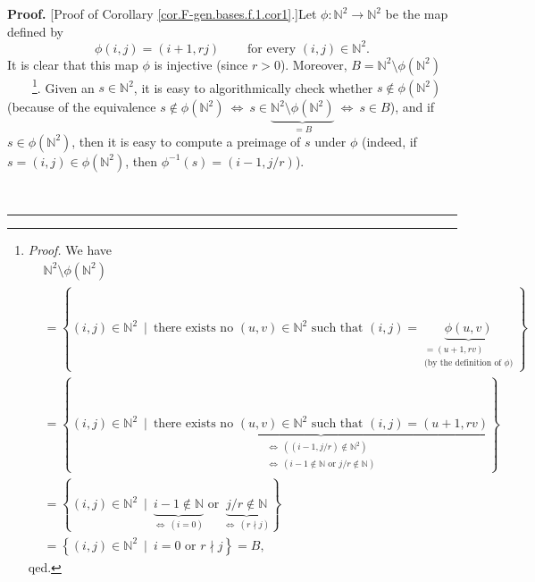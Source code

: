 \documentclass[numbers=enddot,12pt,final,onecolumn,notitlepage]{scrartcl}%
\theoremstyle{definition}
\newenvironment{proof}[1][Proof]{\noindent\textbf{#1.} }{\ \rule{0.5em}{0.5em}}
\begin{document}
\begin{proof}
[Proof of Corollary \ref{cor.F-gen.bases.f.1.cor1}.]Let $\phi:\mathbb{N}%
^{2}\rightarrow\mathbb{N}^{2}$ be the map defined by%
\[
\phi\left(  i,j\right)  =\left(  i+1,rj\right)  \ \ \ \ \ \ \ \ \ \ \text{for
every }\left(  i,j\right)  \in\mathbb{N}^{2}.
\]
It is clear that this map $\phi$ is injective (since $r>0$). Moreover,
$B=\mathbb{N}^{2}\setminus\phi\left(  \mathbb{N}^{2}\right)  $%
\ \ \ \ \footnote{\textit{Proof.} We have
\begin{align*}
&  \mathbb{N}^{2}\setminus\phi\left(  \mathbb{N}^{2}\right) \\
&  =\left\{  \left(  i,j\right)  \in\mathbb{N}^{2}\ \mid\ \text{there exists
no }\left(  u,v\right)  \in\mathbb{N}^{2}\text{ such that }\left(  i,j\right)
=\underbrace{\phi\left(  u,v\right)  }_{\substack{=\left(  u+1,rv\right)
\\\text{(by the definition of }\phi\text{)}}}\right\} \\
&  =\left\{  \left(  i,j\right)  \in\mathbb{N}^{2}\ \mid
\ \underbrace{\text{there exists no }\left(  u,v\right)  \in\mathbb{N}%
^{2}\text{ such that }\left(  i,j\right)  =\left(  u+1,rv\right)
}_{\substack{\Longleftrightarrow\ \left(  \left(  i-1,j/r\right)
\notin\mathbb{N}^{2}\right)  \\\Longleftrightarrow\ \left(  i-1\notin%
\mathbb{N}\text{ or }j/r\notin\mathbb{N}\right)  }}\right\} \\
&  =\left\{  \left(  i,j\right)  \in\mathbb{N}^{2}\ \mid
\ \underbrace{i-1\notin\mathbb{N}}_{\Longleftrightarrow\ \left(  i=0\right)
}\text{ or }\underbrace{j/r\notin\mathbb{N}}_{\Longleftrightarrow\ \left(
r\nmid j\right)  }\right\} \\
&  =\left\{  \left(  i,j\right)  \in\mathbb{N}^{2}\ \mid\ i=0\text{ or }r\nmid
j\right\}  =B,
\end{align*}
qed.}. Given an $s\in\mathbb{N}^{2}$, it is easy to algorithmically check
whether $s\notin\phi\left(  \mathbb{N}^{2}\right)  $ (because of the
equivalence $s\notin\phi\left(  \mathbb{N}^{2}\right)  \ \Longleftrightarrow
\ s\in\underbrace{\mathbb{N}^{2}\setminus\phi\left(  \mathbb{N}^{2}\right)
}_{=B}\ \Longleftrightarrow\ s\in B$), and if $s\in\phi\left(  \mathbb{N}%
^{2}\right)  $, then it is easy to compute a preimage of $s$ under $\phi$
(indeed, if $s=\left(  i,j\right)  \in\phi\left(  \mathbb{N}^{2}\right)  $,
then $\phi^{-1}\left(  s\right)  =\left(  i-1,j/r\right)  $).


\end{proof}
\end{document}
